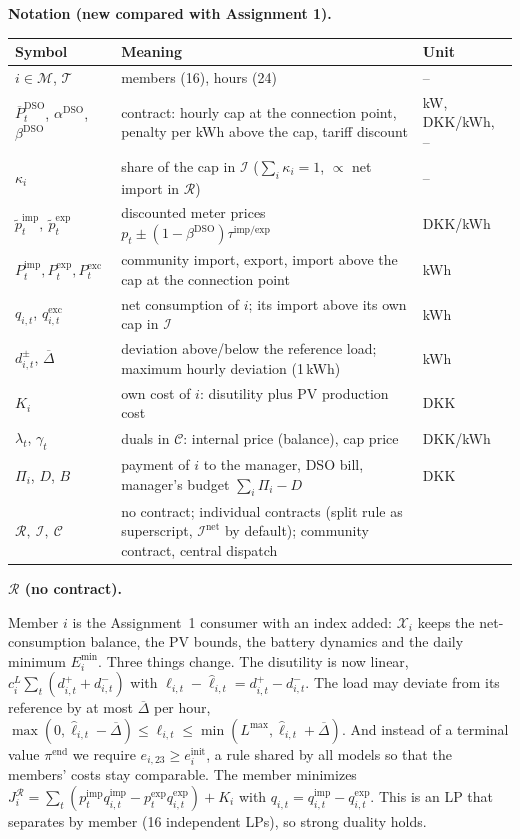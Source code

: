 \documentclass[10pt,a4paper]{article}
\newcommand{\cR}{\mathcal{R}}
\newcommand{\cI}{\mathcal{I}}
\newcommand{\cC}{\mathcal{C}}
\newcommand{\cM}{\mathcal{M}}
\newcommand{\cT}{\mathcal{T}}
\newcommand{\pti}{\tilde p^{\mathrm{imp}}_t}
\newcommand{\pte}{\tilde p^{\mathrm{exp}}_t}
\newcommand{\Pimp}{P^{\mathrm{imp}}_t}
\newcommand{\Pexp}{P^{\mathrm{exp}}_t}
\newcommand{\Pexc}{P^{\mathrm{exc}}_t}
\newcommand{\Pcap}{\overline P^{\mathrm{DSO}}_t}
\newcommand{\aD}{\alpha^{\mathrm{DSO}}}
\newcommand{\bD}{\beta^{\mathrm{DSO}}}
\newcommand{\qitem}[2]{\par\smallskip\noindent{\color{dtured}\textbf{#1}}\enspace\textbf{#2}\par\nopagebreak}
\begin{document}
\qitem{A1}{Notation (new compared with Assignment 1).}
{\small
\begin{tabularx}{\linewidth}{@{}l X l@{}}
\toprule
Symbol & Meaning & Unit \\
\midrule
$i\in\cM$, $\cT$ & members (16), hours (24) & -- \\
$\Pcap$, $\aD$, $\bD$ & contract: hourly cap at the connection point, penalty per kWh above the cap, tariff discount & kW, DKK/kWh, -- \\
$\kappa_i$ & share of the cap in $\cI$ ($\sum_i\kappa_i=1$, $\propto$ net import in $\cR$) & -- \\
$\pti,\ \pte$ & discounted meter prices $p_t\pm(1-\bD)\tau^{\mathrm{imp}/\mathrm{exp}}$ & DKK/kWh \\
$\Pimp,\Pexp,\Pexc$ & community import, export, import above the cap at the connection point & kWh \\
$q_{i,t}$, $q^{\mathrm{exc}}_{i,t}$ & net consumption of $i$; its import above its own cap in $\cI$ & kWh \\
$d^{\pm}_{i,t}$, $\overline\Delta$ & deviation above/below the reference load; maximum hourly deviation (1\,kWh) & kWh \\
$K_i$ & own cost of $i$: disutility plus PV production cost & DKK \\
$\lambda_t$, $\gamma_t$ & duals in $\cC$: internal price (balance), cap price & DKK/kWh \\
$\Pi_i$, $D$, $B$ & payment of $i$ to the manager, DSO bill, manager's budget $\sum_i\Pi_i-D$ & DKK \\
\midrule
$\cR,\ \cI,\ \cC$ & no contract; individual contracts (split rule as superscript, $\cI^{\mathrm{net}}$ by default); community contract, central dispatch & \\
\bottomrule
\end{tabularx}}

\qitem{A2}{$\cR$ (no contract).}
\begin{answer}
Member $i$ is the Assignment~1 consumer with an index added: $\mathcal X_i$ keeps the net-consumption balance, the PV bounds, the battery dynamics and the daily minimum $E^{\min}_i$. Three things change. The disutility is now linear, $c^L_i\sum_t(d^+_{i,t}+d^-_{i,t})$ with $\ell_{i,t}-\hat\ell_{i,t}=d^+_{i,t}-d^-_{i,t}$. The load may deviate from its reference by at most $\overline\Delta$ per hour, $\max(0,\hat\ell_{i,t}-\overline\Delta)\le\ell_{i,t}\le\min(L^{\max},\hat\ell_{i,t}+\overline\Delta)$. And instead of a terminal value $\pi^{\mathrm{end}}$ we require $e_{i,23}\ge e^{\mathrm{init}}_i$, a rule shared by all models so that the members' costs stay comparable. The member minimizes $J^{\cR}_i=\sum_t(p^{\mathrm{imp}}_t q^{\mathrm{imp}}_{i,t}-p^{\mathrm{exp}}_t q^{\mathrm{exp}}_{i,t})+K_i$ with $q_{i,t}=q^{\mathrm{imp}}_{i,t}-q^{\mathrm{exp}}_{i,t}$. This is an LP that separates by member (16 independent LPs), so strong duality holds.
\end{answer}
\end{document}
